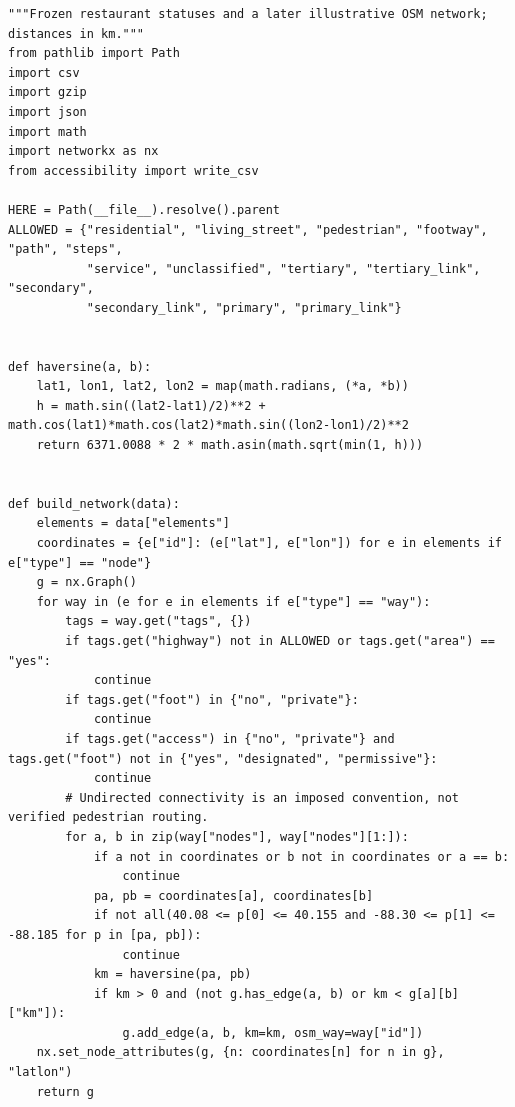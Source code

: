 \begin{Verbatim}[breaklines,breakanywhere,fontsize=\small]
"""Frozen restaurant statuses and a later illustrative OSM network; distances in km."""
from pathlib import Path
import csv
import gzip
import json
import math
import networkx as nx
from accessibility import write_csv

HERE = Path(__file__).resolve().parent
ALLOWED = {"residential", "living_street", "pedestrian", "footway", "path", "steps",
           "service", "unclassified", "tertiary", "tertiary_link", "secondary",
           "secondary_link", "primary", "primary_link"}


def haversine(a, b):
    lat1, lon1, lat2, lon2 = map(math.radians, (*a, *b))
    h = math.sin((lat2-lat1)/2)**2 + math.cos(lat1)*math.cos(lat2)*math.sin((lon2-lon1)/2)**2
    return 6371.0088 * 2 * math.asin(math.sqrt(min(1, h)))


def build_network(data):
    elements = data["elements"]
    coordinates = {e["id"]: (e["lat"], e["lon"]) for e in elements if e["type"] == "node"}
    g = nx.Graph()
    for way in (e for e in elements if e["type"] == "way"):
        tags = way.get("tags", {})
        if tags.get("highway") not in ALLOWED or tags.get("area") == "yes":
            continue
        if tags.get("foot") in {"no", "private"}:
            continue
        if tags.get("access") in {"no", "private"} and tags.get("foot") not in {"yes", "designated", "permissive"}:
            continue
        # Undirected connectivity is an imposed convention, not verified pedestrian routing.
        for a, b in zip(way["nodes"], way["nodes"][1:]):
            if a not in coordinates or b not in coordinates or a == b:
                continue
            pa, pb = coordinates[a], coordinates[b]
            if not all(40.08 <= p[0] <= 40.155 and -88.30 <= p[1] <= -88.185 for p in [pa, pb]):
                continue
            km = haversine(pa, pb)
            if km > 0 and (not g.has_edge(a, b) or km < g[a][b]["km"]):
                g.add_edge(a, b, km=km, osm_way=way["id"])
    nx.set_node_attributes(g, {n: coordinates[n] for n in g}, "latlon")
    return g



\end{Verbatim}
